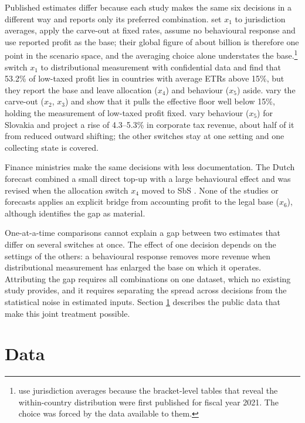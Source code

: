 \documentclass[11pt,a4paper]{article}
\newcommand{\EUR}{\texteuro}
\begin{document}
Published estimates differ because each study makes the same six decisions in a different way and reports only its preferred combination. \citet{barake2022} set $x_1$ to jurisdiction averages, apply the carve-out at fixed rates, assume no behavioural response and use reported profit as the base; their global figure of about \EUR179 billion is therefore one point in the scenario space, and the averaging choice alone understates the base.\footnote{\citet{barake2022} use jurisdiction averages because the bracket-level tables that reveal the within-country distribution were first published for fiscal year 2021. The choice was forced by the data available to them.} \citet{hugger2026} switch $x_1$ to distributional measurement with confidential data and find that 53.2\% of low-taxed profit lies in countries with average ETRs above 15\%, but they report the base and leave allocation ($x_4$) and behaviour ($x_5$) aside. \citet{devereux2023} vary the carve-out ($x_2$, $x_3$) and show that it pulls the effective floor well below 15\%, holding the measurement of low-taxed profit fixed. \citet{boukal2026} vary behaviour ($x_5$) for Slovakia and project a rise of 4.3–5.3\% in corporate tax revenue, about half of it from reduced outward shifting; the other switches stay at one setting and one collecting state is covered.

Finance ministries make the same decisions with less documentation. The Dutch forecast combined a small direct top-up with a large behavioural effect and was revised when the allocation switch $x_4$ moved to SbS \citep{36369_3,1028}. None of the studies or forecasts applies an explicit bridge from accounting profit to the legal base ($x_6$), although \citet{hanlon2023} identifies the gap as material.

One-at-a-time comparisons cannot explain a gap between two estimates that differ on several switches at once. The effect of one decision depends on the settings of the others: a behavioural response removes more revenue when distributional measurement has enlarged the base on which it operates. Attributing the gap requires all combinations on one dataset, which no existing study provides, and it requires separating the spread across decisions from the statistical noise in estimated inputs. Section \ref{sec:data} describes the public data that make this joint treatment possible.

\section{Data}\label{sec:data}
\end{document}
